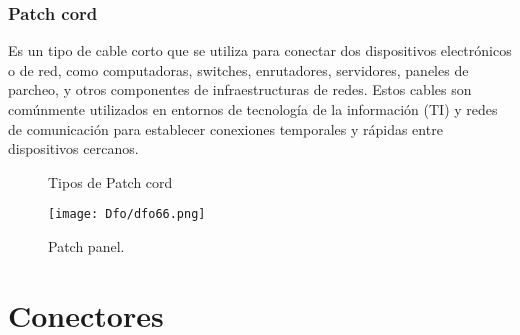 \documentclass[
	12pt, %
	fleqn, %
	a4paper, %
	oneside, %
]{LegrandOrangeBook}
\begin{document}
\subsection{Patch cord}
Es un tipo de cable corto que se utiliza para conectar dos dispositivos electrónicos o de red, como computadoras, switches, enrutadores, servidores, paneles de parcheo, y otros componentes de infraestructuras de redes. Estos cables son comúnmente utilizados en entornos de tecnología de la información (TI) y redes de comunicación para establecer conexiones temporales y rápidas entre dispositivos cercanos.
\begin{figure}[]
\centering
{}
\caption{Tipos de Patch cord}
\end{figure}
\begin{figure}[H]
\centering
\texttt{[image: Dfo/dfo66.png]}
\caption{Patch panel.}
\end{figure}
\chapter{Conectores}
\end{document}
